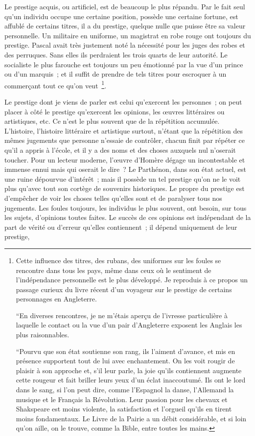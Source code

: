 \documentclass[french,twoside]{book} %
\begin{document}
Le prestige acquis, ou artificiel, est de beaucoup le plus répandu. Par le fait seul qu’un individu occupe une certaine position, possède une certaine fortune, est affublé de certains titres, il a du prestige, quelque nulle que puisse être sa valeur personnelle. Un militaire en uniforme, un magistrat en robe rouge ont toujours du prestige. Pascal avait très justement noté la nécessité pour les juges des robes et des perruques. Sans elles ils perdraient les trois quarts de leur autorité. Le socialiste le plus farouche est toujours un peu émotionné par la vue d’un prince ou d’un marquis ; et il suffit de prendre de tels titres pour escroquer à un commerçant tout ce qu’on veut \footnote{ \noindent Cette influence des titres, des rubans, des uniformes sur les foules se rencontre dans tous les pays, même dans ceux où le sentiment de l’indépendance personnelle est le plus développé. Je reproduis à ce propos un passage curieux du livre récent d’un voyageur sur le prestige de certains personnages en Angleterre.\par
 “En diverses rencontres, je ne m’étais aperçu de l’ivresse particulière à laquelle le contact ou la vue d’un pair d’Angleterre exposent les Anglais les plus raisonnables.\par
 “Pourvu que son état soutienne son rang, ils l’aiment d’avance, et mis en présence supportent tout de lui avec enchantement. On les voit rougir de plaisir à son approche et, s’il leur parle, la joie qu’ils contiennent augmente cette rougeur et fait briller leurs yeux d’un éclat inaccoutumé. Ils ont le lord dans le sang, si l’on peut dire, comme l’Espa­gnol la danse, l’Allemand la musique et le Français la Révo­lution. Leur passion pour les chevaux et Shakspeare est moins violente, la satisfaction et l’orgueil qu’ils en tirent moins fondamentaux. Le Livre de la Pairie a un débit considérable, et si loin qu’on aille, on le trouve, comme la Bible, entre toutes les mains.
}.\par
Le prestige dont je viens de parler est celui qu’exercent les personnes ; on peut placer à côté le prestige qu’exercent les opinions, les œuvres littéraires ou artistiques, etc. Ce n’est le plus souvent que de la répétition accumulée. L’histoire, l’histoire littéraire et artistique surtout, n’étant que la répétition des mêmes jugements que personne n’essaie de contrôler, chacun finit par répéter ce qu’il a appris à l’école, et il y a des noms et des choses auxquels nul n’oserait toucher. Pour un lecteur moderne, l’œuvre d’Homère dégage un incontestable et immense ennui mais qui oserait le dire ? Le Parthénon, dans son état actuel, est une ruine dépourvue d’intérêt ; mais il possède un tel prestige qu’on ne le voit plus qu’avec tout son cortège de souvenirs historiques. Le propre du prestige est d’empêcher de voir les choses telles qu’elles sont et de paralyser tous nos jugements. Les foules toujours, les individus le plus souvent, ont besoin, sur tous les sujets, d’opinions toutes faites. Le succès de ces opinions est indépendant de la part de vérité ou d’erreur qu’elles contiennent ; il dépend unique­ment de leur prestige,\par
\end{document}
